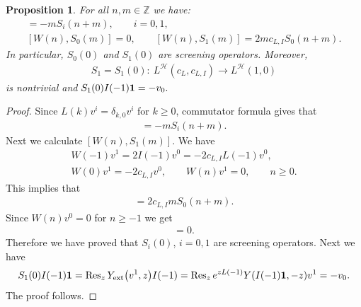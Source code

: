 \documentclass[pdftex]{sigma}
\numberwithin{equation}{section}
\newtheorem{Proposition}[Theorem]{Proposition}
 { \theoremstyle{definition}
\newtheorem{Example}[Theorem]{Example}
\newtheorem{Remark}[Theorem]{Remark} }
\newcommand{\Z}{\mathbb Z}
\newcommand{\HVir}{\mathcal H}
\begin{document}
\begin{Proposition}
For all $n,m\in \Z$ we have:
\begin{gather*}
[L(n), S_i (m)] = - m S_i (n+m), \qquad i=0,1,\\
[W(n), S_0 (m) ] = 0, \qquad [W(n), S_1(m) ] = 2 m c_{L,I} S_0( n+m).
\end{gather*}
In particular, $S_0 (0) $ and $S_1(0)$ are screening operators. Moreover,
\begin{gather*}
S_1= S_1(0) \colon \ L^{\HVir} (c_L, c_{L,I}) \rightarrow L^{\HVir} (1,0)
\end{gather*}
is nontrivial and $ S_1 (0) I(-1) {\bf 1} = - v_0. $
\end{Proposition}

\begin{proof} Since $L(k) v^{i} = \delta_{k,0} v^{i}$ for $k \ge 0$, commutator formula gives that
\begin{gather*}
[L(n), S_i(m)] = - m S_i (n+m).
\end{gather*}
Next we calculate $[W(n), S_1 (m)]$. We have
\begin{gather*}
W(-1) v^1 = 2 I(-1) v^0 = - 2 c_{L,I} L(-1) v^0, \\
W(0) v^1 = - 2 c_{L,I} v^ 0, \qquad W(n) v^1 = 0, \qquad n \ge 0.
\end{gather*}
This implies that
\begin{gather*}
[W(n), S_1 (m) ] = 2 c_{L,I} m S_0 (n+m).
\end{gather*}
Since $W(n) v^0 = 0$ for $n \ge -1$ we get
\begin{gather*}
[ W(n), S_0 (m) ] = 0.
\end{gather*}
Therefore we have proved that $S_i(0)$, $i= 0,1$ are screening operators. Next we have
\begin{gather*}
S_1(0) I(-1) {\bf 1} = \operatorname{Res}_z Y_{\rm ext}\big(v^1, z\big) I(-1) = \operatorname{Res}_z e ^{z L(-1)} Y( I(-1) {\bf 1}
,- z) v^1 = - v_0.
\end{gather*}
The proof follows.
\end{proof}
\end{document}
